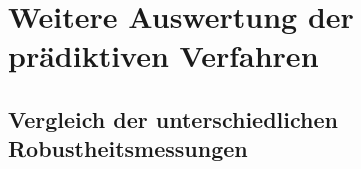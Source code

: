 \vspace*{-25px}
\begin{figure}[H]
\end{figure}

\newpage

\section{Weitere Auswertung der prädiktiven Verfahren}
\label{sec:WeitereAuswertung_Prädiktiv}

\subsection{Vergleich der unterschiedlichen Robustheitsmessungen}
\label{sec:WeitereAuswertung_Robustness}

